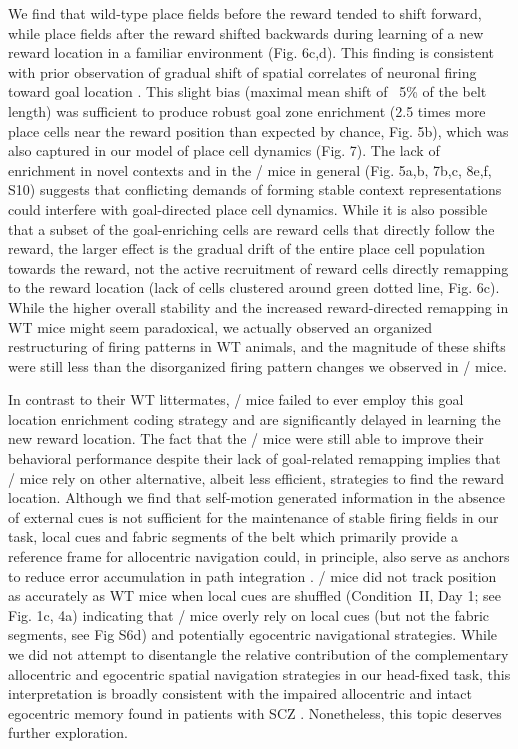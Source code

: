 We find that wild-type place fields before the reward tended to shift forward, while place fields after the reward shifted backwards during learning of a new reward location in a familiar environment (Fig. 6c,d). This finding is consistent with prior observation of gradual shift of spatial correlates of neuronal firing toward goal location \citep{Lee2006}. This slight bias (maximal mean shift of ~5\% of the belt length) was sufficient to produce robust goal zone enrichment (2.5 times more place cells near the reward position than expected by chance, Fig. 5b), which was also captured in our model of place cell dynamics (Fig. 7). The lack of enrichment in novel contexts and in the \df/ mice in general (Fig. 5a,b, 7b,c, 8e,f, S10) suggests that conflicting demands of forming stable context representations could interfere with goal-directed place cell dynamics.  While it is also possible that a subset of the goal-enriching cells are reward cells that directly follow the reward, the larger effect is the gradual drift of the entire place cell population towards the reward, not the active recruitment of reward cells directly remapping to the reward location (lack of cells clustered around green dotted line, Fig. 6c). While the higher overall stability and the increased reward-directed remapping in WT mice might seem paradoxical, we actually observed an organized restructuring of firing patterns in WT animals, and the magnitude of these shifts were still less than the disorganized firing pattern changes we observed in \df/ mice.

In contrast to their WT littermates, \df/ mice failed to ever employ this goal location enrichment coding strategy and are significantly delayed in learning the new reward location. The fact that the \df/ mice were  still able to improve their behavioral performance despite their lack of goal-related remapping implies that \df/ mice rely on other alternative, albeit less efficient, strategies to find the reward location. Although we find that self-motion generated information in the absence of external cues is not sufficient for the maintenance of stable firing fields in our task, local cues and fabric segments of the belt which primarily provide a reference frame for allocentric navigation could, in principle, also serve as anchors to reduce error accumulation in path integration \citep{Etienne2004, Gothard1996}. \df/ mice did not track position as accurately as WT mice when local cues are shuffled (Condition~II, Day 1; see Fig. 1c, 4a) indicating that \df/ mice overly rely on local cues (but not the fabric segments, see Fig S6d) and potentially egocentric navigational strategies. While we did not attempt to disentangle the relative contribution of the complementary allocentric and egocentric spatial navigation strategies in our head-fixed task, this interpretation is broadly consistent with the impaired allocentric and intact egocentric memory found in patients with SCZ \citep{Agarwal2015, Weniger2008}.  Nonetheless, this topic deserves further exploration.

